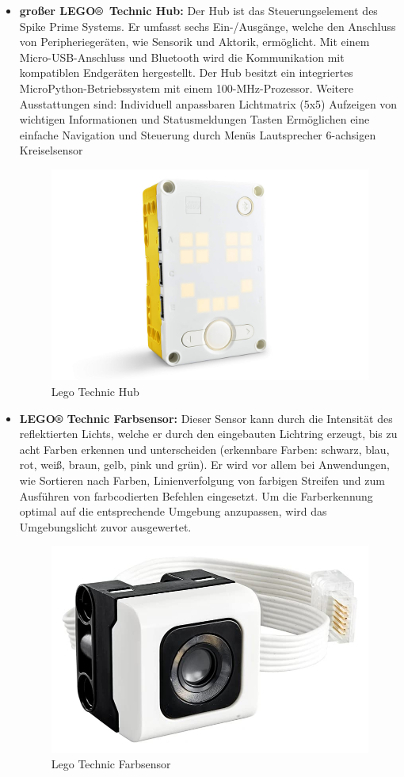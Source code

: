 \begin{itemize}
	\item \textbf{großer LEGO® Technic Hub:}
	Der Hub ist das Steuerungselement des Spike Prime Systems. Er umfasst sechs Ein-/Ausgänge, welche den Anschluss von Peripheriegeräten, wie Sensorik und Aktorik, ermöglicht. Mit einem Micro-USB-Anschluss und Bluetooth wird die Kommunikation mit kompatiblen Endgeräten hergestellt. Der Hub besitzt ein integriertes MicroPython-Betriebssystem mit einem 100-MHz-Prozessor. 
	Weitere Ausstattungen sind:
	Individuell anpassbaren Lichtmatrix (5x5)
	Aufzeigen von wichtigen Informationen und Statusmeldungen
	Tasten
	Ermöglichen eine einfache Navigation und Steuerung durch Menüs 
	Lautsprecher
	6-achsigen Kreiselsensor
	
	\begin{figure}[H]
		\centering
		\includegraphics[width=0.5\linewidth]{images/Hub}
		\caption{Lego Technic Hub}
		\label{fig:hub}
	\end{figure}
	
	
	\item \textbf{LEGO® Technic Farbsensor:}
	Dieser Sensor kann durch die Intensität des reflektierten Lichts, welche er durch den eingebauten Lichtring erzeugt, bis zu acht Farben erkennen und unterscheiden (erkennbare Farben: schwarz, blau, rot, weiß, braun, gelb, pink und grün).  Er wird vor allem bei Anwendungen, wie Sortieren nach Farben, Linienverfolgung von farbigen Streifen und zum Ausführen von farbcodierten Befehlen eingesetzt. Um die Farberkennung optimal auf die entsprechende Umgebung anzupassen, wird das Umgebungslicht zuvor ausgewertet.
	
	\begin{figure}[H]
		\centering
		\includegraphics[width=0.5\linewidth]{images/Farbsensor}
		\caption{Lego Technic Farbsensor}
		\label{fig:farbsensor}
	\end{figure}
	

\end{itemize}
